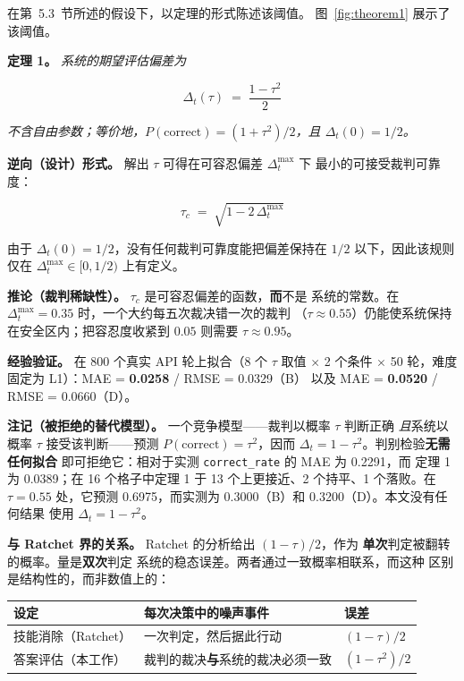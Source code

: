 \documentclass{article}
\begin{document}
在第~5.3~节所述的假设下，以定理的形式陈述该阈值。
图~\ref{fig:theorem1} 展示了该阈值。

\textbf{定理 1。} \textit{系统的期望评估偏差为}

\[
  \Delta_t(\tau) \;=\; \frac{1-\tau^{2}}{2}
\]

\textit{不含自由参数；等价地，$P(\text{correct}) = (1+\tau^{2})/2$，且
$\Delta_t(0) = 1/2$。}

\textbf{逆向（设计）形式。} 解出 $\tau$ 可得在可容忍偏差 $\Delta_t^{\max}$ 下
最小的可接受裁判可靠度：

\[
  \tau_c \;=\; \sqrt{1 - 2\,\Delta_t^{\max}}
\]

由于 $\Delta_t(0) = 1/2$，没有任何裁判可靠度能把偏差保持在 $1/2$ 以下，因此该规则
仅在 $\Delta_t^{\max} \in [0, 1/2)$ 上有定义。

\textbf{推论（裁判稀缺性）。} $\tau_c$ 是可容忍偏差的函数，\textbf{而}不是
系统的常数。在 $\Delta_t^{\max} = 0.35$ 时，一个大约每五次裁决错一次的裁判
（$\tau \approx 0.55$）仍能使系统保持在安全区内；把容忍度收紧到
$0.05$ 则需要 $\tau \approx 0.95$。

\textbf{经验验证。} 在 800 个真实 API 轮上拟合（8 个 $\tau$ 取值 $\times$ 2
个条件 $\times$ 50 轮，难度固定为 L1）：MAE = \textbf{0.0258} / RMSE = 0.0329（B）
以及 MAE = \textbf{0.0520} / RMSE = 0.0660（D）。

\textbf{注记（被拒绝的替代模型）。} 一个竞争模型——裁判以概率 $\tau$ 判断正确
\textit{且}系统以概率 $\tau$ 接受该判断——预测
$P(\text{correct}) = \tau^{2}$，因而 $\Delta_t = 1-\tau^{2}$。判别检验\textbf{无需任何拟合}
即可拒绝它：相对于实测 \texttt{correct\_rate} 的 MAE 为 0.2291，而
定理 1 为 0.0389；在 16 个格子中定理 1 于 13 个上更接近、2 个持平、1 个落败。在
$\tau = 0.55$ 处，它预测 0.6975，而实测为 0.3000（B）和 0.3200（D）。本文没有任何结果
使用 $\Delta_t = 1-\tau^{2}$。

\textbf{与 Ratchet 界的关系。} Ratchet 的分析给出 $(1 - \tau)/2$，作为
\textbf{单次}判定被翻转的概率。量是\textbf{双次}判定
系统的稳态误差。两者通过一致概率相联系，而这种
区别是结构性的，而非数值上的：

\begin{center}
\small
\begin{tabular}{@{}lll@{}}
  \toprule
  设定 & 每次决策中的噪声事件 & 误差 \\
  \midrule
  技能消除（Ratchet） & 一次判定，然后据此行动 & $(1 - \tau)/2$ \\
  答案评估（本工作） & 裁判的裁决\textbf{与}系统的裁决必须一致 & $(1 - \tau^2)/2$ \\
  \bottomrule
\end{tabular}
\end{center}
\end{document}
